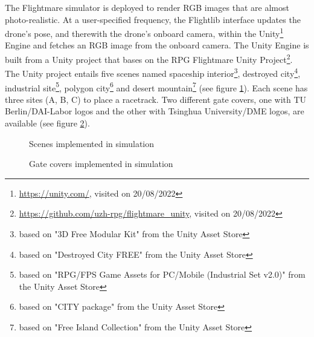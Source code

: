The Flightmare \cite{Song2020} simulator is deployed to render 
RGB images that are almost photo-realistic.
At a user-specified frequency,
the Flightlib interface
updates the drone's pose, and therewith the drone's onboard camera,
within the Unity\footnote{
    \url{https://unity.com/}, visited on 20/08/2022
} Engine and fetches an RGB image from the onboard camera.
The Unity Engine is built from a Unity project
that bases on the RPG Flightmare Unity Project\footnote{
    \url{https://github.com/uzh-rpg/flightmare_unity}, visited on 20/08/2022
}.
The Unity project
entails five scenes named
spaceship interior\footnote{
    based on "3D Free Modular Kit" from the Unity Asset Store
},
destroyed city\footnote{
    based on "Destroyed City FREE" from the Unity Asset Store
},
industrial site\footnote{
    based on "RPG/FPS Game Assets for PC/Mobile (Industrial Set v2.0)" from the Unity Asset Store
},
polygon city\footnote{
    based on "CITY package" from the Unity Asset Store
}
and desert mountain\footnote{
    based on "Free Island Collection" from the Unity Asset Store
}
(see figure \ref{fig:unity_scenes}).
Each scene has three sites (A, B, C) to place a racetrack.
Two different gate covers, 
one with TU Berlin/DAI-Labor logos and the other with Tsinghua University/DME logos, 
are available (see figure \ref{fig:unity_gates}).
\begin{figure}[h]
    \centering
    \par
    \caption[
        Scenes implemented in simulation
    ]{
        Scenes implemented in simulation
        \label{fig:unity_scenes}
    }
\end{figure}
\begin{figure}[h]
    \centering
    \caption[
        Gate covers implemented in simulation
    ]{
        Gate covers implemented in simulation
        \label{fig:unity_gates}
    }
\end{figure}

